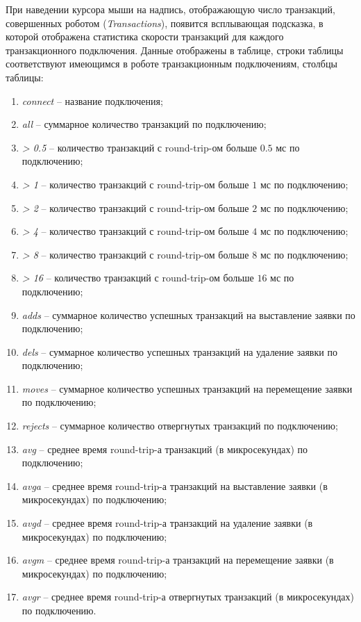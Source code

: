 При наведении курсора мыши на надпись, отображающую число транзакций, совершенных роботом (\textit{Transactions}), появится всплывающая подсказка, в которой отображена
статистика скорости транзакций для каждого транзакционного подключения. Данные отображены в таблице, строки таблицы соответствуют имеющимся в роботе транзакционным
подключениям, столбцы таблицы:
\begin{enumerate}
	\item \textit{connect} -- название подключения;
	\item \textit{all} -- суммарное количество транзакций по подключению;
	\item \textit{> 0.5} -- количество транзакций с round-trip-ом больше $0.5$ мс по подключению;
	\item \textit{> 1} -- количество транзакций с round-trip-ом больше $1$ мс по подключению;
	\item \textit{> 2} -- количество транзакций с round-trip-ом больше $2$ мс по подключению;
	\item \textit{> 4} -- количество транзакций с round-trip-ом больше $4$ мс по подключению;
	\item \textit{> 8} -- количество транзакций с round-trip-ом больше $8$ мс по подключению;
	\item \textit{> 16} -- количество транзакций с round-trip-ом больше $16$ мс по подключению;
	\item \textit{adds} -- суммарное количество успешных транзакций на выставление заявки по подключению;
	\item \textit{dels} -- суммарное количество успешных транзакций на удаление заявки по подключению;
	\item \textit{moves} -- суммарное количество успешных транзакций на перемещение заявки по подключению;
	\item \textit{rejects} -- суммарное количество отвергнутых транзакций по подключению;
	\item \textit{avg} -- среднее время round-trip-а транзакций (в микросекундах) по подключению;
	\item \textit{avga} -- среднее время round-trip-а транзакций на выставление заявки (в микросекундах) по подключению;
	\item \textit{avgd} -- среднее время round-trip-а транзакций на удаление заявки (в микросекундах) по подключению;
	\item \textit{avgm} -- среднее время round-trip-а транзакций на перемещение заявки (в микросекундах) по подключению;
	\item \textit{avgr} -- среднее время round-trip-а отвергнутых транзакций (в микросекундах) по подключению.
\end{enumerate}

